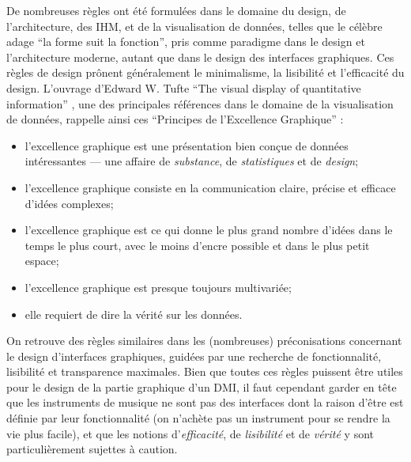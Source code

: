 \noindent De nombreuses règles ont été formulées dans le domaine du design, de l'architecture, des \gls{IHM}, et de la visualisation de données, telles que le célèbre adage ``la forme suit la fonction'', pris comme paradigme dans le design et l'architecture moderne, autant que dans le design des interfaces graphiques. Ces règles de design prônent généralement le minimalisme, la lisibilité et l'efficacité du design. L'ouvrage d'Edward W. Tufte ``The visual display of quantitative information'' \cite{tufte_visual_2001}, une des principales références dans le domaine de la visualisation de données, rappelle ainsi ces ``Principes de l'Excellence Graphique'' :
\vspace{-1em}
\begin{itemize}[noitemsep]
	\item l'excellence graphique est une présentation bien conçue de données intéressantes — une affaire de \textit{substance}, de \textit{statistiques} et de \textit{design};
	\item l'excellence graphique consiste en la communication claire, précise et efficace d'idées complexes;
	\item l'excellence graphique est ce qui donne le plus grand nombre d'idées dans le temps le plus court, avec le moins d'encre possible et dans le plus petit espace;
	\item l'excellence graphique est presque toujours multivariée;
	\item elle requiert de dire la vérité sur les données.
\end{itemize}

\noindent On retrouve des règles similaires dans les (nombreuses) préconisations concernant le design d'interfaces graphiques, guidées par une recherche de fonctionnalité, lisibilité et transparence maximales. Bien que toutes ces règles puissent être utiles pour le design de la partie graphique d'un \gls{DMI}, il faut cependant garder en tête que les instruments de musique ne sont pas des interfaces dont la raison d'être est définie par leur fonctionnalité (on n'achète pas un instrument pour se rendre la vie plus facile), et que les notions d'\textit{efficacité}, de \textit{lisibilité} et de \textit{vérité} y sont particulièrement sujettes à caution.


